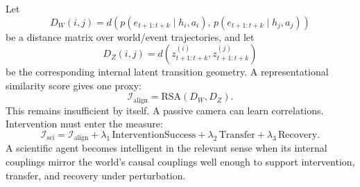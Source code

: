 \documentclass[11pt]{article}
\begin{document}
Let
\begin{equation}
  D_W(i,j)=d\left(p(e_{t+1:t+k}\mid h_i,a_i),\,p(e_{t+1:t+k}\mid h_j,a_j)\right)
\end{equation}
be a distance matrix over world/event trajectories, and let
\begin{equation}
  D_Z(i,j)=d\left(z_{t+1:t+k}^{(i)},z_{t+1:t+k}^{(j)}\right)
\end{equation}
be the corresponding internal latent transition geometry. A representational similarity score gives one proxy:
\begin{equation}
  \mathcal{I}_{\mathrm{align}} = \mathrm{RSA}(D_W,D_Z).
\end{equation}
This remains insufficient by itself. A passive camera can learn correlations. Intervention must enter the measure:
\begin{equation}
  \mathcal{I}_{\mathrm{sci}} = \mathcal{I}_{\mathrm{align}} + \lambda_1\,\mathrm{InterventionSuccess} + \lambda_2\,\mathrm{Transfer} + \lambda_3\,\mathrm{Recovery}.
\end{equation}
A scientific agent becomes intelligent in the relevant sense when its internal couplings mirror the world's causal couplings well enough to support intervention, transfer, and recovery under perturbation.
\end{document}
